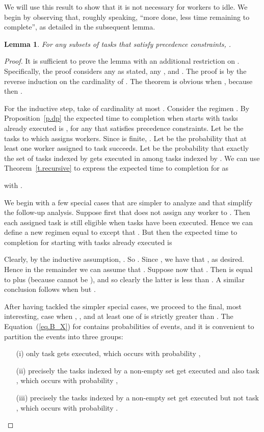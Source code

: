 \documentclass[letterpaper,11pt]{article}
\newtheorem{lemma}[theorem]{Lemma}
\begin{document}
We will use this result to show that it is not necessary for workers to idle. We begin by observing that, roughly speaking, ``more done, less time remaining to complete'', as detailed in the subsequent lemma.

\begin{lemma}
\label{l.monotone}
For any subsets  of tasks that satisfy precedence constraints, .
\end{lemma}

\begin{proof}
It is sufficient to prove the lemma with an additional restriction on . Specifically, the proof considers any  as stated, any , and . The proof is by the reverse induction on the cardinality of . The theorem is obvious when , because then .


For the inductive step, take  of cardinality at most . Consider the regimen . By Proposition~\ref{p.dp} the expected time to completion when  starts with tasks  already executed is , for any  that satisfies precedence constraints. Let  be the tasks to which  assigns workers. Since  is finite, . Let  be the probability that at least one worker assigned to task  succeeds. 
Let  be the probability that exactly the set of tasks indexed by  gets executed in  among tasks indexed by . We can use Theorem~\ref{t.recursive} to express the expected time to completion for  as

with .

We begin with a few special cases that are simpler to analyze and that simplify the follow-up analysis. 
Suppose first that  does not assign any worker to . Then each assigned task is still eligible when tasks  have been executed. Hence we can define a new regimen  equal to  except that . But then the expected time to completion for  starting with tasks  already executed is

Clearly, by the inductive assumption, . So . Since , we have that , as desired. 
Hence in the remainder we can assume that .
Suppose now that . Then  is equal to  plus  (because  cannot be ), and so clearly the latter is less than . A similar conclusion follows when  but . 

After having tackled the simpler special cases, we proceed to the final, most interesting, case when , , and at least one of  is strictly greater than . 
The Equation~(\ref{eq.B_X}) for  contains probabilities of events, and it is convenient to partition the events into three groups:
\begin{itemize}
\item[(i)] only task  gets executed, which occurs with probability ,
\item[(ii)] precisely the tasks indexed by a non-empty set  get executed and also task , which occurs with probability ,
\item[(iii)] precisely the tasks indexed by a non-empty set  get executed but not task , which occurs with probability .
\end{itemize}



\end{proof}
\end{document}
